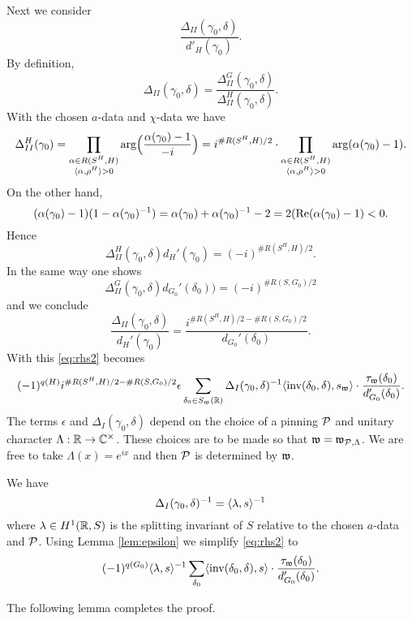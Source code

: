 \documentclass{article}
\theoremstyle{definition}
\numberwithin{equation}{section}
\renewcommand{\-}{\hyp{}}
\begin{document}
Next we consider
\[ \frac{\Delta_{II}(\gamma_0,\delta)}{d'_H(\gamma_0)}.\]
By definition,
\[ \Delta_{II}(\gamma_0,\delta) = \frac{\Delta_{II}^G(\gamma_0,\delta)}{\Delta_{II}^H(\gamma_0,\delta)}.\]
With the chosen $a$-data and $\chi$-data we have
\[ \Delta_{II}^H(\gamma_0)=\prod\limits_{\substack{\alpha \in R(S^H,H)\\ \langle\alpha,\rho^H\rangle>0}}\textrm{arg}\Big(\frac{\alpha(\gamma_0)-1}{-i}\Big) = i^{\#R(S^H,H)/2}\cdot\prod\limits_{\substack{\alpha \in R(S^H,H)\\ \langle\alpha,\rho^H\rangle>0}}\textrm{arg}(\alpha(\gamma_0)-1). \]
On the other hand,
\[ (\alpha(\gamma_0)-1)(1-\alpha(\gamma_0)^{-1})=\alpha(\gamma_0)+\alpha(\gamma_0)^{-1}-2=2(\textrm{Re}(\alpha(\gamma_0)-1) < 0.\]
Hence
\[ \Delta_{II}^H(\gamma_0,\delta)d_H'(\gamma_0) = (-i)^{\#R(S^H,H)/2}. \]
In the same way one shows
\[ \Delta_{II}^G(\gamma_0,\delta)d_{G_0}'(\delta_0)) = (-i)^{\#R(S,G_0)/2} \]
and we conclude
\[ \frac{\Delta_{II}(\gamma_0,\delta)}{d_H'(\gamma_0)} = \frac{i^{\#R(S^H,H)/2-\#R(S,G_0)/2}}{d_{G_0}'(\delta_0)}.\]
With this \eqref{eq:rhs2} becomes
\[ (-1)^{q(H)}i^{\#R(S^H,H)/2-\#R(S,G_0)/2}\epsilon \sum_{\delta_0 \in S_{\mathfrak{w}}(\mathbb{R})}\Delta_I(\gamma_0,\delta)^{-1} \langle\textrm{inv}(\delta_0,\delta),s_{\mathfrak{w}}\rangle \cdot\frac{\tau_{\mathfrak{w}}(\delta_0)}{d'_{G_0}(\delta_0)}. \]
The terms $\epsilon$ and $\Delta_I(\gamma_0,\delta)$ depend on the choice of a pinning $\mathcal{P}$ and unitary character $\Lambda : \mathbb{R} \to \mathbb{C}^\times$. These choices are to be made so that $\mathfrak{w}=\mathfrak{w}_{\mathcal{P},\Lambda}$. We are free to take $\Lambda(x)=e^{ix}$ and then $\mathcal{P}$ is determined by $\mathfrak{w}$. 

We have
\[ \Delta_{I}(\gamma_0,\delta)^{-1} = \langle\lambda,s\rangle^{-1} \]
where $\lambda \in H^1(\mathbb{R},S)$ is the splitting invariant of $S$ relative to the chosen $a$-data and $\mathcal{P}$. Using Lemma \ref{lem:epsilon} we simplify \eqref{eq:rhs2} to
\[(-1)^{q(G_0)}\langle\lambda,s\rangle^{-1}\sum_{\delta_0}\langle\textrm{inv}(\delta_0,\delta),s\rangle\cdot\frac{\tau_{\mathfrak{w}}(\delta_0)}{d_{G_0}'(\delta_0)}. \]

The following lemma completes the proof.
\end{document}

